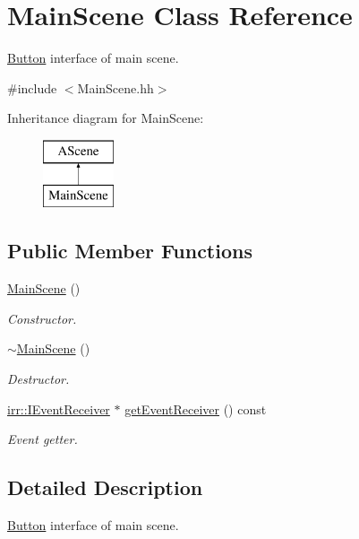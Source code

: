 \hypertarget{classMainScene}{}\section{Main\+Scene Class Reference}
\label{classMainScene}


\hyperlink{classButton}{Button} interface of main scene.  




{\ttfamily \#include $<$Main\+Scene.\+hh$>$}

Inheritance diagram for Main\+Scene\+:\begin{figure}[H]
\begin{center}
\leavevmode
\includegraphics[height=2.000000cm]{classMainScene}
\end{center}
\end{figure}
\subsection*{Public Member Functions}
\begin{DoxyCompactItemize}
\item 
\hyperlink{classMainScene_ad0d02863b2e1eaf96d4d2f9277398afc}{Main\+Scene} ()
\begin{DoxyCompactList}\small\item\em Constructor. \end{DoxyCompactList}\item 
\hyperlink{classMainScene_a6f5a9b6606eb0534d828a11881e0a73f}{$\sim$\+Main\+Scene} ()
\begin{DoxyCompactList}\small\item\em Destructor. \end{DoxyCompactList}\item 
\hyperlink{classirr_1_1IEventReceiver}{irr\+::\+I\+Event\+Receiver} $\ast$ \hyperlink{classMainScene_af9fbc6337aa6ff42447c702e91e77237}{get\+Event\+Receiver} () const
\begin{DoxyCompactList}\small\item\em Event getter. \end{DoxyCompactList}\end{DoxyCompactItemize}


\subsection{Detailed Description}
\hyperlink{classButton}{Button} interface of main scene. 

